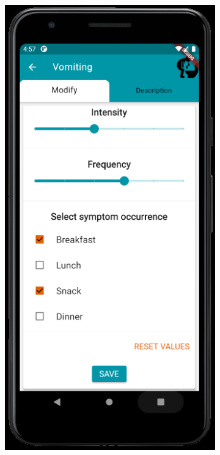 \documentclass [12pt]{article}
\begin{document}
\begin{description}[leftmargin=1cm,rightmargin=1cm]
\begin{figure}[h!]
\hspace*{\fill}
\begin{subfigure}[tr]{0.3\linewidth}
\includegraphics[width=\linewidth]{addSymptom3.PNG}

\end{subfigure}
\end{figure}
\end{description}
\end{document}
